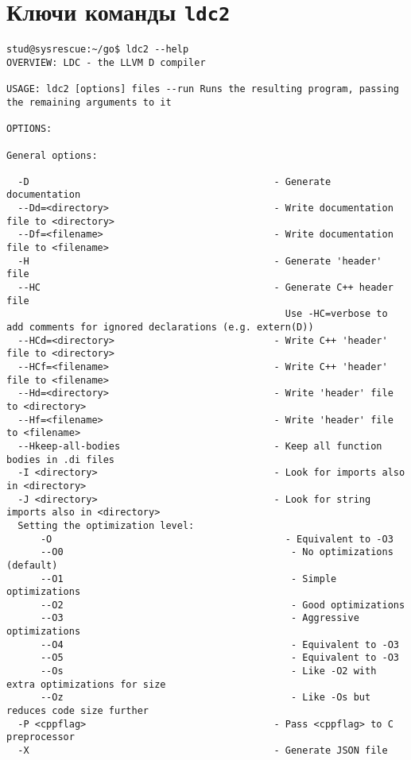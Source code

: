 \documentclass{studrep}
\begin{document}
\chapter{Ключи команды \texttt{ldc2}}
\begin{verbatim}
stud@sysrescue:~/go$ ldc2 --help
OVERVIEW: LDC - the LLVM D compiler

USAGE: ldc2 [options] files --run Runs the resulting program, passing the remaining arguments to it

OPTIONS:

General options:

  -D                                           - Generate documentation
  --Dd=<directory>                             - Write documentation file to <directory>
  --Df=<filename>                              - Write documentation file to <filename>
  -H                                           - Generate 'header' file
  --HC                                         - Generate C++ header file
                                                 Use -HC=verbose to add comments for ignored declarations (e.g. extern(D))
  --HCd=<directory>                            - Write C++ 'header' file to <directory>
  --HCf=<filename>                             - Write C++ 'header' file to <filename>
  --Hd=<directory>                             - Write 'header' file to <directory>
  --Hf=<filename>                              - Write 'header' file to <filename>
  --Hkeep-all-bodies                           - Keep all function bodies in .di files
  -I <directory>                               - Look for imports also in <directory>
  -J <directory>                               - Look for string imports also in <directory>
  Setting the optimization level:
      -O                                         - Equivalent to -O3
      --O0                                        - No optimizations (default)
      --O1                                        - Simple optimizations
      --O2                                        - Good optimizations
      --O3                                        - Aggressive optimizations
      --O4                                        - Equivalent to -O3
      --O5                                        - Equivalent to -O3
      --Os                                        - Like -O2 with extra optimizations for size
      --Oz                                        - Like -Os but reduces code size further
  -P <cppflag>                                 - Pass <cppflag> to C preprocessor
  -X                                           - Generate JSON file

\end{verbatim}
\end{document}
